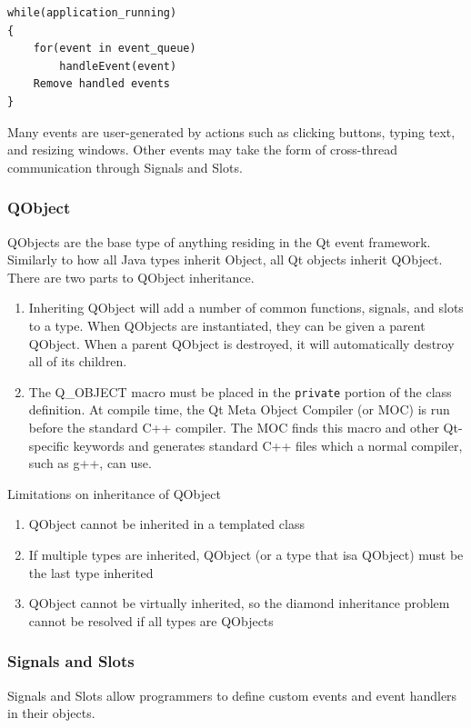 	\begin{lstlisting}[caption={Pseudocode for the Qt Event Loop}]
while(application_running)
{
	for(event in event_queue)
		handleEvent(event)
	Remove handled events
}
	\end{lstlisting}
	
	Many events are user-generated by actions such as clicking buttons, typing text, and resizing windows. Other events may take the form of cross-thread communication through Signals and Slots.
	
\subsubsection*{QObject}
	QObjects are the base type of anything residing in the Qt event framework. Similarly to how all Java types inherit Object, all Qt objects inherit QObject. There are two parts to QObject inheritance.
	\begin{enumerate}
		\item Inheriting QObject will add a number of common functions, signals, and slots to a type. When QObjects are instantiated, they can be given a parent QObject. When a parent QObject is destroyed, it will automatically destroy all of its children.
		\item The Q\_OBJECT macro must be placed in the \lstinline|private| portion of the class definition. At compile time, the Qt Meta Object Compiler (or MOC) is run before the standard C++ compiler. The MOC finds this macro and other Qt-specific keywords and generates standard C++ files which a normal compiler, such as g++, can use.
	\end{enumerate}
	
	Limitations on inheritance of QObject
\begin{enumerate}
	\item QObject cannot be inherited in a templated class
	\item If multiple types are inherited, QObject (or a type that isa QObject) must be the last type inherited
	\item QObject cannot be virtually inherited, so the diamond inheritance problem cannot be resolved if all types are QObjects
\end{enumerate}
	
\subsubsection*{Signals and Slots}
Signals and Slots allow programmers to define custom events and event handlers in their objects. 

